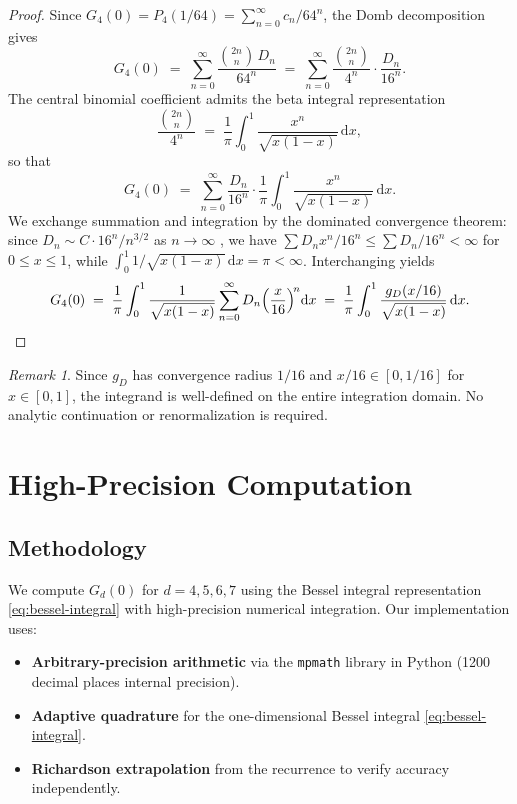 \documentclass[12pt,a4paper]{article}
\numberwithin{equation}{section}
\theoremstyle{plain}
\theoremstyle{definition}
\theoremstyle{remark}
\newtheorem{remark}[theorem]{Remark}
\newcommand{\dd}{\mathrm{d}}
\begin{document}
\begin{proof}
Since $G_4(0) = P_4(1/64) = \sum_{n=0}^\infty c_n / 64^n$, the Domb decomposition gives
\[
  G_4(0) \;=\; \sum_{n=0}^\infty \frac{\binom{2n}{n}\,D_n}{64^n}
  \;=\; \sum_{n=0}^\infty \frac{\binom{2n}{n}}{4^n} \cdot \frac{D_n}{16^n}.
\]
The central binomial coefficient admits the beta integral representation
\[
  \frac{\binom{2n}{n}}{4^n} \;=\; \frac{1}{\pi} \int_0^1 \frac{x^n}{\sqrt{x(1-x)}}\,\dd x,
\]
so that
\[
  G_4(0) \;=\; \sum_{n=0}^\infty \frac{D_n}{16^n} \cdot \frac{1}{\pi}
  \int_0^1 \frac{x^n}{\sqrt{x(1-x)}}\,\dd x.
\]
We exchange summation and integration by the dominated convergence theorem:
since $D_n \sim C \cdot 16^n / n^{3/2}$ as $n \to \infty$ \cite{Guttmann2009},
we have $\sum D_n x^n / 16^n \leq \sum D_n / 16^n < \infty$ for $0 \leq x \leq 1$,
while $\int_0^1 1/\sqrt{x(1-x)}\,\dd x = \pi < \infty$.
Interchanging yields
\[
  G_4(0) \;=\; \frac{1}{\pi} \int_0^1 \frac{1}{\sqrt{x(1-x)}}
  \sum_{n=0}^\infty D_n \Bigl(\frac{x}{16}\Bigr)^{\!n} \dd x
  \;=\; \frac{1}{\pi} \int_0^1 \frac{g_D(x/16)}{\sqrt{x(1-x)}}\,\dd x. \qedhere
\]
\end{proof}

\begin{remark}
Since $g_D$ has convergence radius $1/16$ and $x/16 \in [0, 1/16]$ for $x \in [0,1]$,
the integrand is well-defined on the entire integration domain.
No analytic continuation or renormalization is required.
\end{remark}

\section{High-Precision Computation}\label{sec:computation}

\subsection{Methodology}

We compute $G_d(0)$ for $d = 4, 5, 6, 7$ using the Bessel integral representation \eqref{eq:bessel-integral}
with high-precision numerical integration. Our implementation uses:
\begin{itemize}[leftmargin=*,itemsep=2pt]
  \item \textbf{Arbitrary-precision arithmetic} via the \texttt{mpmath} library in Python (1200 decimal places internal precision).
  \item \textbf{Adaptive quadrature} for the one-dimensional Bessel integral \eqref{eq:bessel-integral}.
  \item \textbf{Richardson extrapolation} from the recurrence to verify accuracy independently.
\end{itemize}
\end{document}
